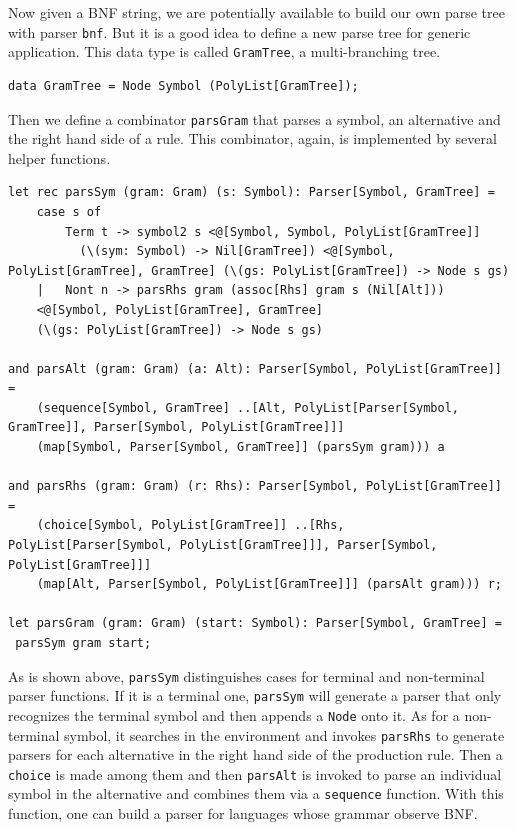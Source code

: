 Now given a BNF string, we are potentially available to build our own parse tree with parser \texttt{bnf}. But it is a good idea to define a new parse tree for generic application. This data type is called \texttt{GramTree}, a multi-branching tree.

\begin{lstlisting}
data GramTree = Node Symbol (PolyList[GramTree]);
\end{lstlisting}

Then we define a combinator \texttt{parsGram} that parses a symbol, an alternative and the right hand side of a rule. This combinator, again, is implemented by several helper functions.

\begin{lstlisting}
let rec parsSym (gram: Gram) (s: Symbol): Parser[Symbol, GramTree] =
    case s of
        Term t -> symbol2 s <@[Symbol, Symbol, PolyList[GramTree]]
          (\(sym: Symbol) -> Nil[GramTree]) <@[Symbol, PolyList[GramTree], GramTree] (\(gs: PolyList[GramTree]) -> Node s gs)
    |   Nont n -> parsRhs gram (assoc[Rhs] gram s (Nil[Alt]))
    <@[Symbol, PolyList[GramTree], GramTree]
    (\(gs: PolyList[GramTree]) -> Node s gs)

and parsAlt (gram: Gram) (a: Alt): Parser[Symbol, PolyList[GramTree]] =
    (sequence[Symbol, GramTree] ..[Alt, PolyList[Parser[Symbol, GramTree]], Parser[Symbol, PolyList[GramTree]]]
    (map[Symbol, Parser[Symbol, GramTree]] (parsSym gram))) a

and parsRhs (gram: Gram) (r: Rhs): Parser[Symbol, PolyList[GramTree]] =
    (choice[Symbol, PolyList[GramTree]] ..[Rhs, PolyList[Parser[Symbol, PolyList[GramTree]]], Parser[Symbol, PolyList[GramTree]]]
    (map[Alt, Parser[Symbol, PolyList[GramTree]]] (parsAlt gram))) r;

let parsGram (gram: Gram) (start: Symbol): Parser[Symbol, GramTree] =
 parsSym gram start;
\end{lstlisting}

As is shown above, \texttt{parsSym} distinguishes cases for terminal and non-terminal parser functions. If it is a terminal one, \texttt{parsSym} will generate a parser that only recognizes the terminal symbol and then appends a \texttt{Node} onto it. As for a non-terminal symbol, it searches in the environment and invokes \texttt{parsRhs} to generate parsers for each alternative in the right hand side of the production rule. Then a \texttt{choice} is made among them and then \texttt{parsAlt} is invoked to parse an individual symbol in the alternative and combines them via a \texttt{sequence} function. With this function, one can build a parser for languages whose grammar observe BNF.

